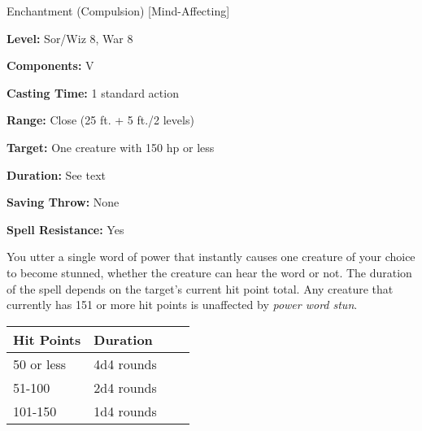 
Enchantment (Compulsion) [Mind-Affecting]

\textbf{Level:} Sor/Wiz 8, War 8

\textbf{Components:} V

\textbf{Casting Time:} 1 standard action

\textbf{Range:} Close (25 ft. + 5 ft./2 levels)

\textbf{Target:} One creature with 150 hp or less

\textbf{Duration:} See text

\textbf{Saving Throw:} None

\textbf{Spell Resistance:} Yes

You utter a single word of power that instantly causes one creature of your choice 
to become stunned, whether the creature can hear the word or not. The duration 
of the spell depends on the target's current hit point total. Any creature that 
currently has 151 or more hit points is unaffected by \textit{power word stun}.

\begin{longtable}{llll}
\hline
\multicolumn{1}{|p{0.749in}|}{\begin{minipage}[t]{0.749in}\raggedright
\textbf{Hit Points}\end{minipage}} & \multicolumn{1}{p{0.772in}|}{\begin{minipage}[t]{0.772in}\raggedright
\textbf{Duration}\end{minipage}}\\
\hline
\multicolumn{1}{p{0.069in}|}{\begin{minipage}[t]{0.069in}\raggedright
50 or less\end{minipage}} & \multicolumn{1}{p{0.069in}|}{\begin{minipage}[t]{0.069in}\raggedright
4d4 rounds\end{minipage}}\\
\hline
\multicolumn{1}{|p{0.749in}|}{\begin{minipage}[t]{0.749in}\raggedright
51-100\end{minipage}} & \multicolumn{1}{p{0.772in}|}{\begin{minipage}[t]{0.772in}\raggedright
2d4 rounds\end{minipage}}\\
\hline
\multicolumn{1}{p{0.069in}|}{\begin{minipage}[t]{0.069in}\raggedright
101-150\end{minipage}} & \multicolumn{1}{p{0.069in}|}{\begin{minipage}[t]{0.069in}\raggedright
1d4 rounds\end{minipage}}\\
\hline
\end{longtable}

